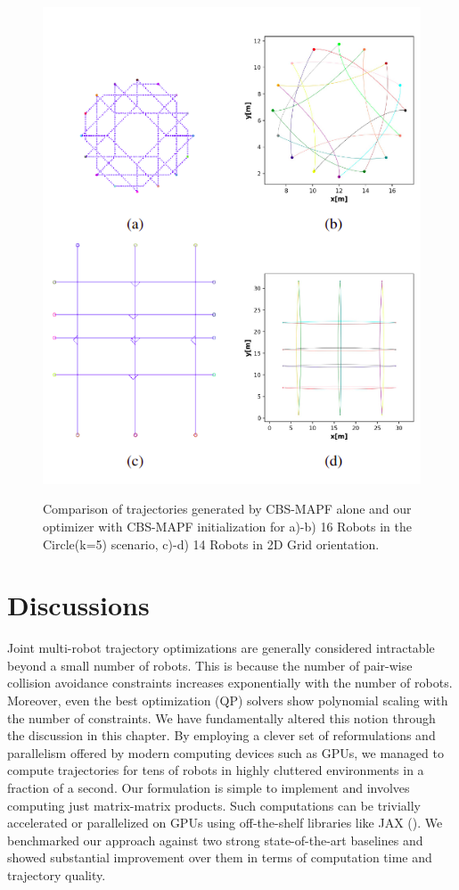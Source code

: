 \begin{figure}[H]
    \centering
    {\includegraphics[scale=0.6]{figures/appendix/mapf_init.png}} 
    \caption[Appendix: Trajectories using MAPF + multi-robot optimizer]{Comparison of trajectories generated by CBS-MAPF alone and our optimizer with CBS-MAPF initialization for a)-b) 16 Robots in the Circle(k=5) scenario, c)-d) 14 Robots in 2D Grid orientation.}
    \label{fig:MAPF+opti_grid}
\end{figure}

\section{Discussions}

Joint multi-robot trajectory optimizations are generally considered intractable beyond a small number of robots. This is because the number of pair-wise collision avoidance constraints increases exponentially with the number of robots. Moreover, even the best optimization (QP) solvers show polynomial scaling with the number of constraints. We have fundamentally altered this notion through the discussion in this chapter. By employing a clever set of reformulations and parallelism offered by modern computing devices such as GPUs, we managed to compute trajectories for tens of robots in highly cluttered environments in a fraction of a second. Our formulation is simple to implement and involves computing just matrix-matrix products. Such computations can be trivially accelerated or parallelized on GPUs using off-the-shelf libraries like JAX (\cite{bradbury2020jax}). We benchmarked our approach against two strong state-of-the-art baselines and showed substantial improvement over them in terms of computation time and trajectory quality. 

